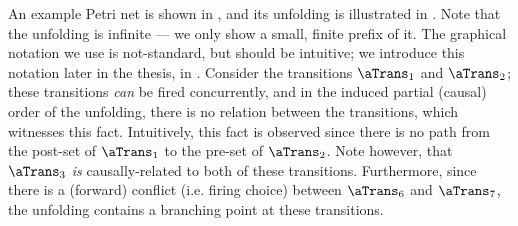 \begin{example}\label{ex:unfolding}
    An example Petri net is shown in , and its
    unfolding is illustrated in . Note that the
    unfolding is infinite --- we only show a small, finite prefix of it. The
    graphical notation we use is not-standard, but should be intuitive; we
    introduce this notation later in the thesis, in
    . Consider the transitions $\aTrans_1$ and
    $\aTrans_2$; these transitions \emph{can} be fired concurrently, and in the
    induced partial (causal) order of the unfolding, there is no relation
    between the transitions, which witnesses this fact. Intuitively, this fact
    is observed since there is no path from the post-set of $\aTrans_1$ to the
    pre-set of $\aTrans_2$. Note however, that $\aTrans_3$ \emph{is}
    causally-related to both of these transitions.  Furthermore, since there is
    a (forward) conflict (i.e. firing choice) between $\aTrans_6$ and
    $\aTrans_7$, the unfolding contains a branching point at these transitions.
\end{example}

